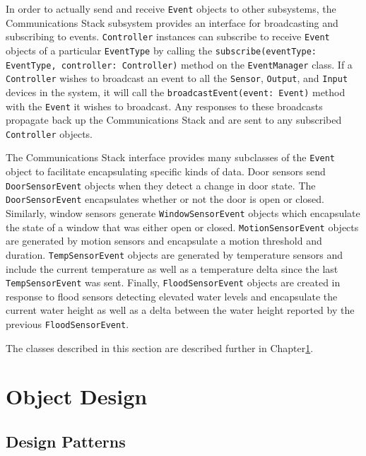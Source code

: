 \documentclass{report}
\begin{document}
In order to actually send and receive \texttt{Event} objects to other
subsystems, the Communications Stack subsystem provides an interface
for broadcasting and subscribing to events. \texttt{Controller}
instances can subscribe to receive \texttt{Event} objects of a
particular \texttt{EventType} by calling the
\texttt{subscribe(eventType: EventType, controller: Controller)}
method on the \texttt{EventManager} class. If a \texttt{Controller}
wishes to broadcast an event to all the \texttt{Sensor},
\texttt{Output}, and \texttt{Input} devices in the system, it will
call the \texttt{broadcastEvent(event: Event)} method with the
\texttt{Event} it wishes to broadcast. Any responses to these
broadcasts propagate back up the Communications Stack and are sent to
any subscribed \texttt{Controller} objects.

The Communications Stack interface provides many subclasses of the
\texttt{Event} object to facilitate encapsulating specific kinds of
data. Door sensors send \texttt{DoorSensorEvent} objects when they
detect a change in door state. The \texttt{DoorSensorEvent}
encapsulates whether or not the door is open or closed. Similarly,
window sensors generate \texttt{WindowSensorEvent} objects which
encapsulate the state of a window that was either open or
closed. \texttt{MotionSensorEvent} objects are generated by motion
sensors and encapsulate a motion threshold and
duration. \texttt{TempSensorEvent} objects are generated by
temperature sensors and include the current temperature as well as a
temperature delta since the last \texttt{TempSensorEvent} was sent. 
Finally, \texttt{FloodSensorEvent} objects are created in response to
flood sensors detecting elevated water levels and encapsulate the
current water height as well as a delta between the water height
reported by the previous \texttt{FloodSensorEvent}.

The classes described in this section are described further in Chapter\ref{ch:object-design}.

\chapter{Object Design} %
\label{ch:object-design}


\section{Design Patterns}
\end{document}
